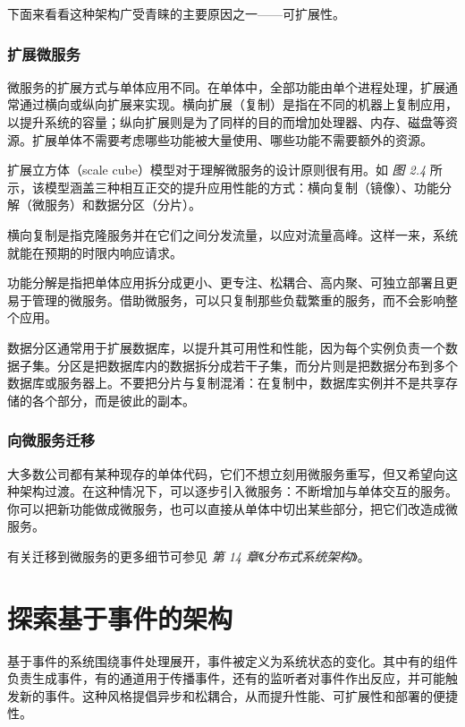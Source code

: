 下面来看看这种架构广受青睐的主要原因之一——可扩展性。

\subsubsection{扩展微服务}

\label{idx:107}
微服务的扩展方式与单体应用不同。在单体中，全部功能由单个进程处理，扩展通常通过横向或纵向扩展来实现。横向扩展（复制）是指在不同的机器上复制应用，以提升系统的容量；纵向扩展则是为了同样的目的而增加处理器、内存、磁盘等资源。扩展单体不需要考虑哪些功能被大量使用、哪些功能不需要额外的资源。

扩展立方体（scale cube）模型对于理解微服务的设计原则很有用。如 \emph{图 2.4} 所示，该模型涵盖三种相互正交的提升应用性能的方式：横向复制（镜像）、功能分解（微服务）和数据分区（分片）。


\label{idx:108}
横向复制是指克隆服务并在它们之间分发流量，以应对流量高峰。这样一来，系统就能在预期的时限内响应请求。

功能分解是指把单体应用拆分成更小、更专注、松耦合、高内聚、可独立部署且更易于管理的微服务。借助微服务，可以只复制那些负载繁重的服务，而不会影响整个应用。

数据分区通常用于扩展数据库，以提升其可用性和性能，因为每个实例负责一个数据子集。分区是把数据库内的数据拆分成若干子集，而分片则是把数据分布到多个数据库或服务器上。不要把分片与复制混淆：在复制中，数据库实例并不是共享存储的各个部分，而是彼此的副本。

\subsubsection{向微服务迁移}

\label{idx:109}
大多数公司都有某种现存的单体代码，它们不想立刻用微服务重写，但又希望向这种架构过渡。在这种情况下，可以逐步引入微服务：不断增加与单体交互的服务。你可以把新功能做成微服务，也可以直接从单体中切出某些部分，把它们改造成微服务。

有关迁移到微服务的更多细节可参见 \emph{第 14 章}《\emph{分布式系统架构}》。

\section{探索基于事件的架构}

\label{idx:110}
基于事件的系统围绕事件处理展开，事件被定义为系统状态的变化。其中有的组件负责生成事件，有的通道用于传播事件，还有的监听者对事件作出反应，并可能触发新的事件。这种风格提倡异步和松耦合，从而提升性能、可扩展性和部署的便捷性。

